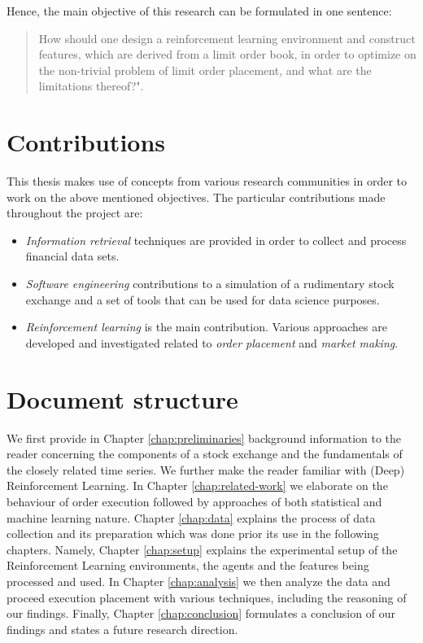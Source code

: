 Hence, the main objective of this research can be formulated in one sentence: \begin{quote}
    How should one design a reinforcement learning environment and construct features, which are derived from a limit order book, in order to optimize on the non-trivial problem of limit order placement, and what are the limitations thereof?".
\end{quote}

\section{Contributions}

This thesis makes use of concepts from various research communities in order to work on the above mentioned objectives.
The particular contributions made throughout the project are:
\begin{itemize}
    \item \textit{Information retrieval} techniques are provided in order to collect and process financial data sets.
    \item \textit{Software engineering} contributions to a simulation of a rudimentary stock exchange and a set of tools that can be used for data science purposes.
    \item \textit{Reinforcement learning} is the main contribution. Various approaches are developed and investigated related to \textit{order placement} and \textit{market making}.
\end{itemize}


\section{Document structure}

We first provide in Chapter \ref{chap:preliminaries} background information to the reader concerning the components of a stock exchange and the fundamentals of the closely related time series.
We further make the reader familiar with (Deep) Reinforcement Learning.
In Chapter \ref{chap:related-work} we elaborate on the behaviour of order execution followed by approaches of both statistical and machine learning nature.
Chapter \ref{chap:data} explains the process of data collection and its preparation which was done prior its use in the following chapters.
Namely, Chapter \ref{chap:setup} explains the experimental setup of the Reinforcement Learning environments, the agents and the features being processed and used.
In Chapter \ref{chap:analysis} we then analyze the data and proceed execution placement with various techniques, including the reasoning of our findings.
Finally, Chapter \ref{chap:conclusion} formulates a conclusion of our findings and states a future research direction.
